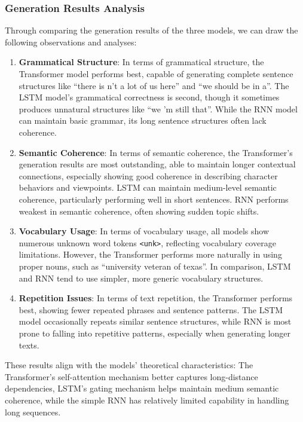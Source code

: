 \documentclass[12pt,oneside]{article}
\begin{document}
\subsubsection{Generation Results Analysis}

Through comparing the generation results of the three models, we can draw the following observations and analyses:

\begin{enumerate}
\item \textbf{Grammatical Structure}: In terms of grammatical structure, the Transformer model performs best, capable of generating complete sentence structures like ``there is n't a lot of us here'' and ``we should be in a''. The LSTM model's grammatical correctness is second, though it sometimes produces unnatural structures like ``we 'm still that''. While the RNN model can maintain basic grammar, its long sentence structures often lack coherence.

\item \textbf{Semantic Coherence}: In terms of semantic coherence, the Transformer's generation results are most outstanding, able to maintain longer contextual connections, especially showing good coherence in describing character behaviors and viewpoints. LSTM can maintain medium-level semantic coherence, particularly performing well in short sentences. RNN performs weakest in semantic coherence, often showing sudden topic shifts.

\item \textbf{Vocabulary Usage}: In terms of vocabulary usage, all models show numerous unknown word tokens \texttt{<unk>}, reflecting vocabulary coverage limitations. However, the Transformer performs more naturally in using proper nouns, such as ``university veteran of texas''. In comparison, LSTM and RNN tend to use simpler, more generic vocabulary structures.

\item \textbf{Repetition Issues}: In terms of text repetition, the Transformer performs best, showing fewer repeated phrases and sentence patterns. The LSTM model occasionally repeats similar sentence structures, while RNN is most prone to falling into repetitive patterns, especially when generating longer texts.
\end{enumerate}

These results align with the models' theoretical characteristics: The Transformer's self-attention mechanism better captures long-distance dependencies, LSTM's gating mechanism helps maintain medium semantic coherence, while the simple RNN has relatively limited capability in handling long sequences.
\end{document}
